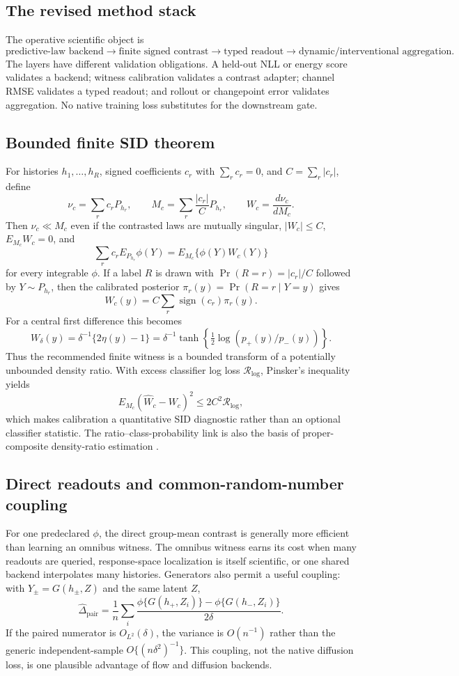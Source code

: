 \documentclass[10pt]{article}
\begin{document}
\subsection{The revised method stack}

The operative scientific object is
\[
  \boxed{\text{predictive-law backend}
  \longrightarrow\text{finite signed contrast}
  \longrightarrow\text{typed readout}
  \longrightarrow\text{dynamic/interventional aggregation}.}
\]
The layers have different validation obligations.  A held-out NLL or energy score
validates a backend; witness calibration validates a contrast adapter; channel RMSE
validates a typed readout; and rollout or changepoint error validates aggregation.
No native training loss substitutes for the downstream gate.

\subsection{Bounded finite SID theorem}

For histories $h_1,\ldots,h_R$, signed coefficients $c_r$ with $\sum_r c_r=0$,
and $C=\sum_r|c_r|$, define
\[
  \nu_c=\sum_r c_rP_{h_r},\qquad
  M_c=\sum_r\frac{|c_r|}{C}P_{h_r},\qquad
  W_c=\frac{d\nu_c}{dM_c}.
\]
Then $\nu_c\ll M_c$ even if the contrasted laws are mutually singular,
$|W_c|\leq C$, $E_{M_c}W_c=0$, and
\[
  \sum_r c_rE_{P_{h_r}}\phi(Y)=E_{M_c}\{\phi(Y)W_c(Y)\}
\]
for every integrable $\phi$.  If a label $R$ is drawn with
$\Pr(R=r)=|c_r|/C$ followed by $Y\sim P_{h_r}$, then the calibrated posterior
$\pi_r(y)=\Pr(R=r\mid Y=y)$ gives
\[
  W_c(y)=C\sum_r\operatorname{sign}(c_r)\pi_r(y).
\]
For a central first difference this becomes
\[
  W_\delta(y)=\delta^{-1}\{2\eta(y)-1\}
  =\delta^{-1}\tanh\!\left\{\tfrac12\log(p_+(y)/p_-(y))\right\}.
\]
Thus the recommended finite witness is a bounded transform of a potentially
unbounded density ratio.  With excess classifier log loss $\mathcal R_{\log}$,
Pinsker's inequality yields
\[
 E_{M_c}(\widehat W_c-W_c)^2\leq2C^2\mathcal R_{\log},
\]
which makes calibration a quantitative SID diagnostic rather than an optional
classifier statistic.  The ratio--class-probability link is also the basis of
proper-composite density-ratio estimation \cite{menon2016}.

\subsection{Direct readouts and common-random-number coupling}

For one predeclared $\phi$, the direct group-mean contrast is generally more
efficient than learning an omnibus witness.  The omnibus witness earns its cost
when many readouts are queried, response-space localization is itself scientific,
or one shared backend interpolates many histories.  Generators also permit a useful
coupling: with $Y_\pm=G(h_\pm,Z)$ and the same latent $Z$,
\[
 \widehat\Delta_{\mathrm{pair}}
 =\frac1n\sum_i
 \frac{\phi\{G(h_+,Z_i)\}-\phi\{G(h_-,Z_i)\}}{2\delta}.
\]
If the paired numerator is $O_{L^2}(\delta)$, the variance is $O(n^{-1})$ rather
than the generic independent-sample $O\{(n\delta^2)^{-1}\}$.  This coupling,
not the native diffusion loss, is one plausible advantage of flow and diffusion
backends.
\end{document}
